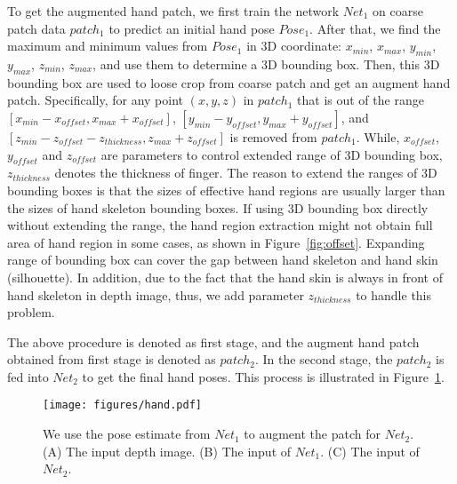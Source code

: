 \documentclass{article}
\begin{document}
To get the augmented hand patch, we first train the network $Net_1$ on coarse patch data $patch_1$ to predict an initial hand pose $Pose_1$.
After that, we find the maximum and minimum values from $Pose_1$ in 3D coordinate: $x_{min}$, $x_{max}$, $y_{min}$, $y_{max}$, $z_{min}$, $z_{max}$, and use them to determine a 3D bounding box.
Then, this 3D bounding box are used to loose crop from coarse patch and get an augment hand patch. Specifically, for any point $(x,y,z)$ in $patch_1$ that is out of the range $[x_{min}-x_{offset}, x_{max}+x_{offset}]$, $[y_{min}-y_{offset}, y_{max}+y_{offset}]$, and $[z_{min}-z_{offset}-z_{thickness}, z_{max}+z_{offset}]$ is removed from $patch_1$. While, $x_{offset}$, $y_{offset}$ and $z_{offset}$ are parameters to control extended range of 3D bounding box, $z_{thickness}$ denotes the thickness of finger.
The reason to extend the ranges of 3D bounding boxes is that the sizes of effective hand regions are usually larger than the sizes of hand skeleton bounding boxes. If using 3D bounding box directly without extending the range, the hand region extraction might not obtain full area of hand region in some cases, as shown in Figure~\ref{fig:offset}. Expanding range of bounding box can cover the gap between hand skeleton and hand skin (silhouette). In addition, due to the fact that the hand skin is always in front of hand skeleton in depth image, thus, we add parameter $z_{thickness}$ to handle this problem.


The above procedure is denoted as first stage, and the augment hand patch obtained from first stage is denoted as $patch_2$.
In the second stage, the $patch_2$ is fed into $Net_2$ to get the final hand poses. This process is illustrated in Figure~\ref{fig:hand_clean}. 


\begin{figure}[t]
	\centering
\texttt{[image: figures/hand.pdf]}
	\caption{We use the pose estimate from $Net_1$ to augment the patch for $Net_2$. (A) The input depth image. (B) The input of $Net_1$. (C) The input of $Net_2$. }
	\label{fig:hand_clean} 
\end{figure}
\end{document}
